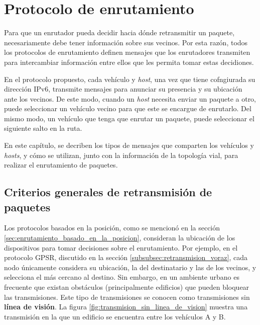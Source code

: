 ﻿\chapter{Protocolo de enrutamiento}
\label{ch:protocolo_de_enrutamiento}

Para que un enrutador pueda decidir hacia dónde retransmitir un paquete,
necesariamente debe tener información sobre sus vecinos. Por esta razón, todos
los protocolos de enrutamiento definen mensajes que los enrutadores transmiten
para intercambiar información entre ellos que les permita tomar estas
decidiones.

En el protocolo propuesto, cada vehículo y \textit{host}, una vez que tiene
cofngiurada su dirección IPv6, transmite mensajes para anunciar su presencia y
su ubicación ante los vecinos. De este modo, cuando un \textit{host} necesita
enviar un paquete a otro, puede seleccionar un vehículo vecino para que este se
encargue de enrutarlo. Del mismo modo, un vehículo que tenga que enrutar un
paquete, puede seleccionar el siguiente salto en la ruta.

En este capítulo, se decriben los tipos de mensajes que comparten los vehículos
y \textit{hosts}, y cómo se utilizan, junto con la información de la topología
vial, para realizar el enrutamiento de paquetes. 

\section{Criterios generales de retransmisión de paquetes}
\label{sec:criterios_generales_retransmision_paquetes}

Los protocolos basados en la posición, como se mencionó en la sección
\ref{sec:enrutamiento_basado_en_la_posicion}, consideran la ubicación de los
dispositivos para tomar decisiones sobre el enrutamiento. Por ejemplo, en el
protocolo GPSR, discutido en la sección \ref{subsubsec:retransmision_voraz},
cada nodo únicamente considera su ubicación, la del destinatario y las de los
vecinos, y selecciona el más cercano al destino. Sin embargo, en un ambiente
urbano es frecuente que existan obstáculos (principalmente edificios) que
pueden bloquear las transmisiones. Este tipo de transmisiones se conocen como
transmisiones sin \textbf{línea de visión}. La figura
\ref{fig:transmision_sin_linea_de_vision} muestra una transmisión en la que un
edificio se encuentra entre los vehículos A y B.

